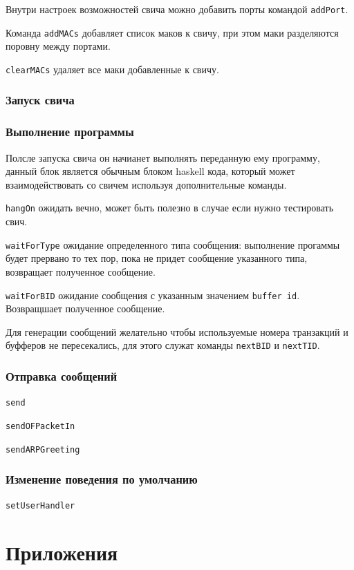 \documentclass[9pt,a4paper]{article}
\begin{document}
Внутри настроек возможностей свича можно добавить порты командой \lstinline!addPort!.

Команда \lstinline!addMACs! добавляет список маков к свичу, при этом маки разделяются
поровну между портами.

\lstinline!clearMACs! удаляет все маки добавленные к свичу.


\subsubsection{Запуск свича}
\subsubsection{Выполнение программы}
Полсле запуска  свича он начианет выполнять переданную ему программу, данный блок 
является обычным блоком haskell кода, который может взаимодействовать со свичем
используя дополнительные команды.

\lstinline!hangOn! ожидать вечно, может быть полезно в случае если нужно тестировать
свич.

\lstinline!waitForType! ожидание определенного типа сообщения: выполнение прогаммы
будет прервано то тех пор, пока не придет сообщение указанного типа, возвращает 
полученное сообщение.

\lstinline!waitForBID! ожидание сообщения с указанным значением \texttt{buffer id}.
Возвращшает полученное сообщение.

Для генерации сообщений желательно чтобы используемые номера транзакций и буфферов 
не пересекались, для этого служат команды \lstinline!nextBID! и \lstinline!nextTID!.

\subsubsection{Отправка сообщений}

\lstinline!send!

\lstinline!sendOFPacketIn!

\lstinline!sendARPGreeting!

\subsubsection{Изменение поведения по умолчанию}

\lstinline!setUserHandler!

\section{Приложения}
\end{document}
